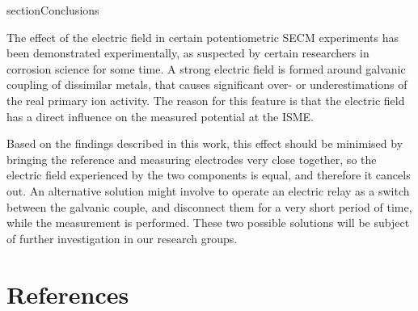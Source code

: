 \documentclass[3p]{elsarticle}
\begin{document}
section{Conclusions}

The effect of the electric field in certain potentiometric SECM experiments has been demonstrated experimentally, as suspected by certain researchers in corrosion science for some time. A strong electric field is formed around galvanic coupling of dissimilar metals, that causes significant over- or underestimations of the real primary ion activity. The reason for this feature is that the electric field has a direct influence on the measured potential at the ISME.

Based on the findings described in this work, this effect should be minimised by bringing the reference and measuring electrodes very close together, so the electric field experienced by the two components is equal, and therefore it cancels out. An alternative solution might involve to operate an electric relay as a switch between the galvanic couple, and disconnect them for a very short period of time, while the measurement is performed. These two possible solutions will be subject of further investigation in our research groups.


\section*{References}
\end{document}
